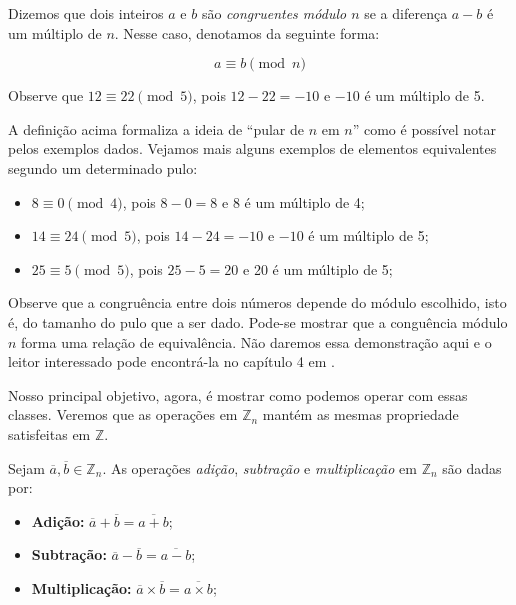 Dizemos que dois inteiros $a$ e $b$ s\~{a}o \textit{congruentes m\'{o}dulo $n$} se a diferen\c{c}a $a-b$ \'{e} um 
m\'{u}ltiplo de $n$. Nesse caso, denotamos da seguinte forma:

$$a \equiv b \pmod{n}$$ 

Observe que $12 \equiv 22 \pmod{5}$, pois $12-22=-10$ e $-10$ \'{e} um m\'{u}ltiplo de 5. 

A defini\c{c}\~{a}o acima formaliza a ideia de ``pular de $n$ em $n$'' como \'{e} poss\'{i}vel notar 
pelos exemplos dados. Vejamos mais alguns exemplos de elementos equivalentes segundo um determinado pulo:
\begin{itemize}
	\item $8 \equiv 0 \pmod{4}$, pois $8-0=8$ e 8 \'{e} um m\'{u}ltiplo de 4;
	\item $14 \equiv 24  \pmod{5}$, pois $14-24=-10$ e $-10$ \'{e} um m\'{u}ltiplo de 5;
	\item $25 \equiv 5 \pmod{5}$, pois $25-5=20$ e 20 \'{e} um m\'{u}ltiplo de 5;
\end{itemize}

Observe que a congru\^{e}ncia entre dois n\'{u}meros depende do m\'{o}dulo escolhido, isto \'{e}, do tamanho 
do pulo que a ser dado. Pode-se mostrar que a congu\^{e}ncia m\'{o}dulo $n$ forma uma rela\c{c}\~{a}o de 
equival\^{e}ncia. N\~{a}o daremos essa demonstra\c{c}\~{a}o aqui e o leitor interessado pode encontr\'{a}-la no 
cap\'{i}tulo 4 em \cite{cou:2014}.

Nosso principal objetivo, agora, \'{e} mostrar como podemos operar com essas classes. Veremos que as 
opera\c{c}\~{o}es em $\mathbb{Z}_{n}$ mant\'{e}m as mesmas propriedade satisfeitas em $\mathbb{Z}$.

\begin{Df}
Sejam $\overline{a},\overline{b}\in\mathbb{Z}_{n}$. As opera\c{c}\~{o}es \textit{adi\c{c}\~{a}o}, 
\textit{subtra\c{c}\~{a}o} e \textit{multiplica\c{c}\~{a}o} em $\mathbb{Z}_{n}$ s\~{a}o dadas por:
	\begin{itemize}
			\item \textbf{Adi\c{c}\~{a}o:} $\overline{a}+\overline{b}=\overline{a+b}$;
			\item \textbf{Subtra\c{c}\~{a}o:} $\overline{a}-\overline{b}=\overline{a-b}$;
			\item \textbf{Multiplica\c{c}\~{a}o:} $\overline{a}\times\overline{b}=\overline{a\times b}$;
	\end{itemize}
\end{Df}

